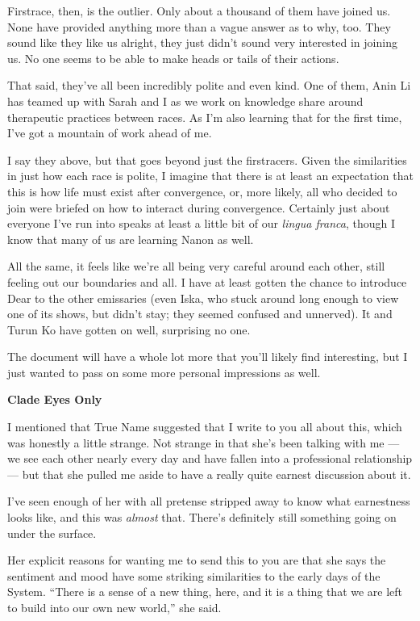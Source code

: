 Firstrace, then, is the outlier. Only about a thousand of them have joined us. None have provided anything more than a vague answer as to why, too. They sound like they like us alright, they just didn't sound very interested in joining us. No one seems to be able to make heads or tails of their actions.

That said, they've all been incredibly polite and even kind. One of them, Anin Li has teamed up with Sarah and I as we work on knowledge share around therapeutic practices between races. As I'm also learning that for the first time, I've got a mountain of work ahead of me.

I say they above, but that goes beyond just the firstracers. Given the similarities in just how each race is polite, I imagine that there is at least an expectation that this is how life must exist after convergence, or, more likely, all who decided to join were briefed on how to interact during convergence. Certainly just about everyone I've run into speaks at least a little bit of our \emph{lingua franca}, though I know that many of us are learning Nanon as well.

All the same, it feels like we're all being very careful around each other, still feeling out our boundaries and all. I have at least gotten the chance to introduce Dear to the other emissaries (even Iska, who stuck around long enough to view one of its shows, but didn't stay; they seemed confused and unnerved). It and Turun Ko have gotten on well, surprising no one.

The document will have a whole lot more that you'll likely find interesting, but I just wanted to pass on some more personal impressions as well.

\textbf{Clade Eyes Only}

I mentioned that True Name suggested that I write to you all about this, which was honestly a little strange. Not strange in that she's been talking with me — we see each other nearly every day and have fallen into a professional relationship — but that she pulled me aside to have a really quite earnest discussion about it.

I've seen enough of her with all pretense stripped away to know what earnestness looks like, and this was \emph{almost} that. There's definitely still something going on under the surface.

Her explicit reasons for wanting me to send this to you are that she says the sentiment and mood have some striking similarities to the early days of the System. ``There is a sense of a new thing, here, and it is a thing that we are left to build into our own new world,'' she said.

